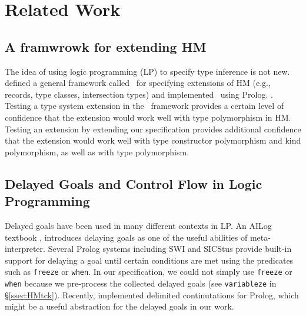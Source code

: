 \section{Related Work}\label{sec:relwork}
\subsection{A framwrowk for extending HM}
The idea of using logic programming (LP) to specify type inference is not new.
\citet*{HMX99} defined a general framework called \HMX\ for specifying
extensions of HM (e.g., records, type classes, intersection types)
and \citet{tyinferCHR02} implemented \HMX\ using Prolog.
. Testing a type system extension
in the \HMX\ framework provides a certain level of confidence that the extension
would work well with type polymorphism in HM. Testing an extension by
extending our specification provides additional confidence that the extension
would work well with type constructor polymorphism and kind polymorphism,
as well as with type polymorphism.

\subsection{Delayed Goals and Control Flow in Logic Programming}
Delayed goals have been used in many different contexts in LP. An AILog
	 textbook \cite{AILogTextBook},
introduces delaying goals as one of the useful abilities of meta-interpreter.
Several Prolog systems including SWI and SICStus provide built-in support for
delaying a goal until certain conditions are met using the predicates
such as {\small\verb|freeze|} or {\small\verb|when|}. In our specification,
we could not simply use {\small\verb|freeze|} or {\small\verb|when|}
because we pre-process the collected delayed goals (see \verb|variableze|
in \S\ref{ssec:HMtck}).
Recently, \citet{SchDemDesWei13} implemented delimited continutations for
Prolog, which might be a useful abstraction for the delayed goals 
in our work.

